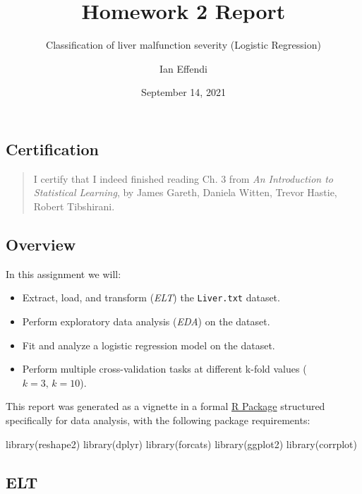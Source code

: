 \documentclass[
  11pt,
  a4paper,
]{scrartcl}
\title{Homework 2 Report}
\subtitle{Classification of liver malfunction severity (Logistic
Regression)}
\author{Ian Effendi}
\date{September 14, 2021}
\newenvironment{Shaded}{\begin{snugshade}}{\end{snugshade}}
\newcommand{\FunctionTok}[1]{\textcolor[rgb]{0.00,0.00,0.00}{#1}}
\newcommand{\NormalTok}[1]{#1}
\providecommand{\tightlist}{%
  \setlength{\itemsep}{0pt}\setlength{\parskip}{0pt}}
\begin{document}
\maketitle

{
\hypersetup{linkcolor=blue}
\setcounter{tocdepth}{3}
\tableofcontents
}
\hypertarget{certification}{%
\subsection{Certification}\label{certification}}

\begin{quote}
I certify that I indeed finished reading Ch. 3 from \emph{An
Introduction to Statistical Learning}, by James Gareth, Daniela Witten,
Trevor Hastie, Robert Tibshirani.
\end{quote}

\hypertarget{overview}{%
\subsection{Overview}\label{overview}}

In this assignment we will:

\begin{itemize}
\tightlist
\item
  Extract, load, and transform (\emph{ELT}) the \texttt{Liver.txt}
  dataset.
\item
  Perform exploratory data analysis (\emph{EDA}) on the dataset.
\item
  Fit and analyze a logistic regression model on the dataset.
\item
  Perform multiple cross-validation tasks at different k-fold values
  (\(k = 3,\, k = 10\)).
\end{itemize}

This report was generated as a vignette in a formal
\href{https://r-pkgs.org/intro.html}{R Package} structured specifically
for data analysis, with the following package requirements:

\begin{Shaded}
\begin{Highlighting}[]
\FunctionTok{library}\NormalTok{(reshape2)}
\FunctionTok{library}\NormalTok{(dplyr)}
\FunctionTok{library}\NormalTok{(forcats)}
\FunctionTok{library}\NormalTok{(ggplot2)}
\FunctionTok{library}\NormalTok{(corrplot)}
\end{Highlighting}
\end{Shaded}

\hypertarget{elt}{%
\subsection{ELT}\label{elt}}
\end{document}

